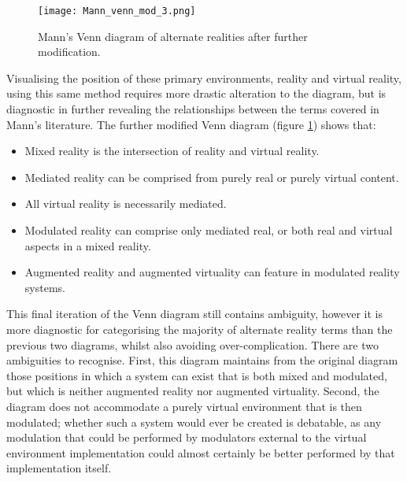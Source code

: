 \begin{figure}[h]
\centering
  \texttt{[image: Mann\_venn\_mod\_3.png]}
  \caption{Mann's Venn diagram of alternate realities after further modification.}
  \label{Mann_venn_mod_3.png}
\end{figure}

Visualising the position of these primary environments, reality and virtual reality, using this same method requires more drastic alteration to the diagram, but is diagnostic in further revealing the relationships between the terms covered in Mann's literature. The further modified Venn diagram (figure \ref{Mann_venn_mod_3.png}) shows that:
\begin{itemize}
	\item Mixed reality is the intersection of reality and virtual reality.
	\item Mediated reality can be comprised from purely real or purely virtual content.
	\item All virtual reality is necessarily mediated.
	\item Modulated reality can comprise only mediated real, or both real and virtual aspects in a mixed reality.
	\item Augmented reality and augmented virtuality can feature in modulated reality systems.
\end{itemize}

This final iteration of the Venn diagram still contains ambiguity, however it is more diagnostic for categorising the majority of alternate reality terms than the previous two diagrams, whilst also avoiding over-complication. There are two ambiguities to recognise. First, this diagram maintains from the original diagram those positions in which a system can exist that is both mixed and modulated, but which is neither augmented reality nor augmented virtuality. Second, the diagram does not accommodate a purely virtual environment that is then modulated; whether such a system would ever be created is debatable, as any modulation that could be performed by modulators external to the virtual environment implementation could almost certainly be better performed by that implementation itself.

